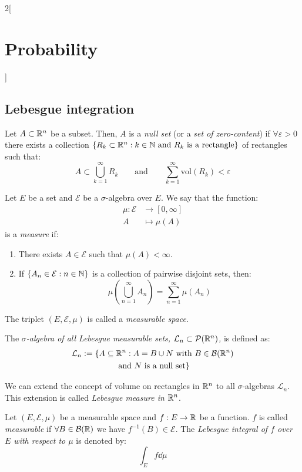 \documentclass[../../../main.tex]{subfiles}
\begin{document}
\begin{multicols}{2}[\section{Probability}]
  \subsection{Lebesgue integration}
  \begin{definition}
    Let $A\subset\mathbb{R}^n$ be a subset. Then, $A$ is a \textit{null set} (or a \textit{set of zero-content}) if $\forall \varepsilon>0$ there exists a collection $\{R_k\subset\mathbb{R}^n:k\in\mathbb{N}\text{ and $R_k$ is a rectangle}\}$ of rectangles such that:
    $$A\subset\bigcup_{k=1}^\infty R_k\qquad\text{and}\qquad\sum_{k=1}^\infty\text{vol}(R_k)<\varepsilon$$
  \end{definition}
  \begin{definition}
    Let $E$ be a set and $\mathcal{E}$ be a $\sigma$-algebra over $E$. We say that the function:
    \begin{align*}
      \mu:\mathcal{E} & \longrightarrow[0,\infty] \\
      A               & \longmapsto\mu(A)
    \end{align*}
    is a \textit{measure} if:
    \begin{enumerate}
      \item There exists $A\in\mathcal{E}$ such that $\mu(A)<\infty$.
      \item If $\{A_n\in\mathcal{E}:n\in\mathbb{N}\}$ is a collection of pairwise disjoint sets, then: $$\mu\left(\bigcup_{n=1}^\infty A_n\right)=\sum_{n=1}^\infty \mu(A_n)$$
    \end{enumerate}
    The triplet $(E,\mathcal{E},\mu)$ is called a \textit{measurable space}.
  \end{definition}
  \begin{definition}
    The \textit{$\sigma$-algebra of all Lebesgue measurable sets, $\mathcal{L}_n\subset\mathcal{P}(\mathbb{R}^n)$,} is defined as:
    \begin{multline*}
      \mathcal{L}_n:=\{A\subseteq\mathbb{R}^n:A=B\cup N\text{ with }B\in\mathcal{B}(\mathbb{R}^n)\\\text{ and $N$ is a null set}\}
    \end{multline*}
  \end{definition}
  \begin{theorem}
    We can extend the concept of volume on rectangles in $\mathbb{R}^n$ to all $\sigma$-algebras $\mathcal{L}_n$. This extension is called \textit{Lebesgue measure in $\mathbb{R}^n$}.
  \end{theorem}
  \begin{definition}
    Let $(E,\mathcal{E},\mu)$ be a measurable space and $f:E\rightarrow\mathbb{R}$ be a function. $f$ is called \textit{measurable} if $\forall B\in\mathcal{B}(\mathbb{R})$ we have $f^{-1}(B)\in\mathcal{E}$. The \textit{Lebesgue integral of $f$ over $E$ with respect to $\mu$} is denoted by: $$\int_Ef\dd\mu$$

\end{definition}
\end{multicols}
\end{document}
